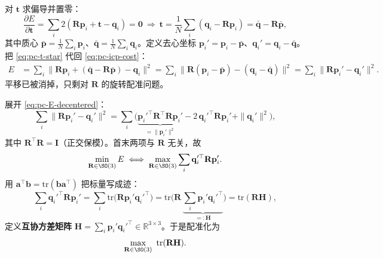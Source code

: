 \begin{derivation}
对 $\mathbf{t}$ 求偏导并置零：
\begin{equation}
  \frac{\partial E}{\partial\mathbf{t}}=\sum_i 2(\mathbf{R}\mathbf{p}_i+\mathbf{t}-\mathbf{q}_i)=\mathbf{0}
  \ \Longrightarrow\
  \mathbf{t}=\frac{1}{N}\sum_i(\mathbf{q}_i-\mathbf{R}\mathbf{p}_i)=\bar{\mathbf{q}}-\mathbf{R}\bar{\mathbf{p}},
  \label{eq:pc-t-star}
\end{equation}
其中质心 $\bar{\mathbf{p}}=\frac{1}{N}\sum_i\mathbf{p}_i$、$\bar{\mathbf{q}}=\frac{1}{N}\sum_i\mathbf{q}_i$。定义去心坐标 $\mathbf{p}_i'=\mathbf{p}_i-\bar{\mathbf{p}}$、$\mathbf{q}_i'=\mathbf{q}_i-\bar{\mathbf{q}}$。把 \cref{eq:pc-t-star} 代回 \cref{eq:pc-icp-cost}：
\begin{align}
  E&=\sum_i\big\|\mathbf{R}\mathbf{p}_i+(\bar{\mathbf{q}}-\mathbf{R}\bar{\mathbf{p}})-\mathbf{q}_i\big\|^2
   =\sum_i\big\|\mathbf{R}(\mathbf{p}_i-\bar{\mathbf{p}})-(\mathbf{q}_i-\bar{\mathbf{q}})\big\|^2
   =\sum_i\big\|\mathbf{R}\mathbf{p}_i'-\mathbf{q}_i'\big\|^2.
  \label{eq:pc-E-decentered}
\end{align}
平移已被消掉，只剩对 $\mathbf{R}$ 的旋转配准问题。
\end{derivation}

\begin{derivation}
展开 \cref{eq:pc-E-decentered}：
\begin{equation}
  \sum_i\|\mathbf{R}\mathbf{p}_i'-\mathbf{q}_i'\|^2
  =\sum_i\Big(\underbrace{\mathbf{p}_i'^\top\mathbf{R}^\top\mathbf{R}\mathbf{p}_i'}_{=\|\mathbf{p}_i'\|^2}-2\,\mathbf{q}_i'^\top\mathbf{R}\mathbf{p}_i'+\|\mathbf{q}_i'\|^2\Big),
  \label{eq:pc-E-expand}
\end{equation}
其中 $\mathbf{R}^\top\mathbf{R}=\mathbf{I}$（正交保模）。首末两项与 $\mathbf{R}$ 无关，故
\begin{equation}
  \min_{\mathbf{R}\in\SO(3)}E\iff \max_{\mathbf{R}\in\SO(3)}\sum_i\mathbf{q}_i'^\top\mathbf{R}\mathbf{p}_i'.
  \label{eq:pc-trace-equiv}
\end{equation}
用 $\mathbf{a}^\top\mathbf{b}=\mathrm{tr}(\mathbf{b}\mathbf{a}^\top)$ 把标量写成迹：
\begin{equation}
  \sum_i\mathbf{q}_i'^\top\mathbf{R}\mathbf{p}_i'
  =\sum_i\mathrm{tr}\!\big(\mathbf{R}\mathbf{p}_i'\mathbf{q}_i'^\top\big)
  =\mathrm{tr}\!\Big(\mathbf{R}\,\underbrace{\textstyle\sum_i\mathbf{p}_i'\mathbf{q}_i'^\top}_{=:\mathbf{H}}\Big)=\mathrm{tr}(\mathbf{R}\mathbf{H}),
  \label{eq:pc-H}
\end{equation}
定义\textbf{互协方差矩阵} $\mathbf{H}=\sum_i\mathbf{p}_i'\mathbf{q}_i'^\top\in\mathbb{R}^{3\times3}$。于是配准化为
\begin{equation}
  \max_{\mathbf{R}\in\SO(3)}\ \mathrm{tr}(\mathbf{R}\mathbf{H}).
  \label{eq:pc-max-trace}
\end{equation}
\end{derivation}

